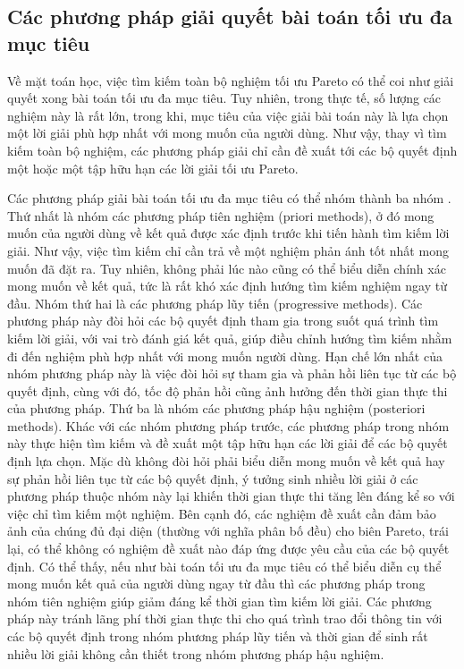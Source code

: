 \documentclass[../main.tex]{subfiles}
\begin{document}
\subsection{Các phương pháp giải quyết bài toán tối ưu đa mục tiêu}

Về mặt toán học, việc tìm kiếm toàn bộ nghiệm tối ưu Pareto có thể coi như giải quyết xong bài toán tối ưu đa mục tiêu. Tuy nhiên, trong thực tế, số lượng các nghiệm này là rất lớn, trong khi, mục tiêu của việc giải bài toán này là lựa chọn một lời giải phù hợp nhất với mong muốn của người dùng. Như vậy, thay vì tìm kiếm toàn bộ nghiệm, các phương pháp giải chỉ cần đề xuất tới các bộ quyết định một hoặc một tập hữu hạn các lời giải tối ưu Pareto.

Các phương pháp giải bài toán tối ưu đa mục tiêu có thể nhóm thành ba nhóm \cite{collette2004multiobjective}. Thứ nhất là nhóm các phương pháp tiên nghiệm (priori methods), ở đó mong muốn của người dùng về kết quả được xác định trước khi tiến hành tìm kiếm lời giải. Như vậy, việc tìm kiếm chỉ cần trả về một nghiệm phản ánh tốt nhất mong muốn đã đặt ra. Tuy nhiên, không phải lúc nào cũng có thể biểu diễn chính xác mong muốn về kết quả, tức là rất khó xác định hướng tìm kiếm nghiệm ngay từ đầu. Nhóm thứ hai là các phương pháp lũy tiến (progressive methods). Các phương pháp này đòi hỏi các bộ quyết định tham gia trong suốt quá trình tìm kiếm lời giải, với vai trò đánh giá kết quả, giúp điều chỉnh hướng tìm kiếm nhằm đi đến nghiệm phù hợp nhất với mong muốn người dùng. Hạn chế lớn nhất của nhóm phương pháp này là việc đòi hỏi sự tham gia và phản hồi liên tục từ các bộ quyết định, cùng với đó, tốc độ phản hồi cũng ảnh hưởng đến thời gian thực thi của phương pháp. Thứ ba là nhóm các phương pháp hậu nghiệm (posteriori methods). Khác với các nhóm phương pháp trước, các phương pháp trong nhóm này thực hiện tìm kiếm và đề xuất một tập hữu hạn các lời giải để các bộ quyết định lựa chọn. Mặc dù không đòi hỏi phải biểu diễn mong muốn về kết quả hay sự phản hồi liên tục từ các bộ quyết định, ý tưởng sinh nhiều lời giải ở các phương pháp thuộc nhóm này lại khiến thời gian thực thi tăng lên đáng kể so với việc chỉ tìm kiếm một nghiệm. Bên cạnh đó, các nghiệm đề xuất cần đảm bảo ảnh của chúng đủ đại diện (thường với nghĩa phân bố đều) cho biên Pareto, trái lại, có thể không có nghiệm đề xuất nào đáp ứng được yêu cầu của các bộ quyết định. Có thể thấy, nếu như bài toán tối ưu đa mục tiêu có thể biểu diễn cụ thể mong muốn kết quả của người dùng ngay từ đầu thì các phương pháp trong nhóm tiên nghiệm giúp giảm đáng kể thời gian tìm kiếm lời giải. Các phương pháp này tránh lãng phí thời gian thực thi cho quá trình trao đổi thông tin với các bộ quyết định trong nhóm phương pháp lũy tiến và thời gian để sinh rất nhiều lời giải không cần thiết trong nhóm phương pháp hậu nghiệm. 
\end{document}
